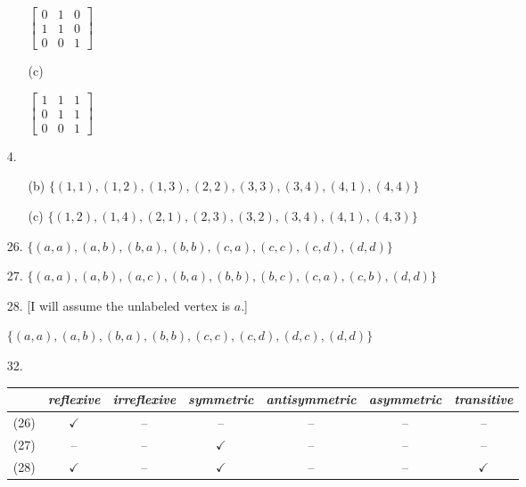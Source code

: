 \documentclass{article}
\begin{document}
\begin{enumerate}
\begin{itemize}
            \vspace{-0.1in}
                $\begin{bmatrix}
                0 & 1 & 0 \\
                1 & 1 & 0 \\
                0 & 0 & 1
                \end{bmatrix}$
            \item[(c)] \hfill

            \vspace{-0.1in}
                $\begin{bmatrix}
                1 & 1 & 1 \\
                0 & 1 & 1 \\
                0 & 0 & 1
                \end{bmatrix}$
        \end{itemize}
    \item[4.]
        \begin{itemize}
            \item[(b)] $\{ (1,1), (1,2), (1,3), (2,2), (3,3), (3,4), (4,1), (4,4) \}$
            \item[(c)] $\{ (1,2), (1,4), (2,1), (2,3), (3,2), (3,4), (4,1), (4,3) \}$
        \end{itemize}
    \item[26.] $\{ (a,a), (a,b), (b,a), (b,b), (c,a), (c,c), (c,d), (d,d) \}$
    \item[27.] $\{ (a,a), (a,b), (a,c), (b,a), (b,b), (b,c), (c,a), (c,b), (d,d) \}$
    \item[28.] [I will assume the unlabeled vertex is $a$.]

    $\{ (a,a), (a,b), (b,a), (b,b), (c,c), (c,d), (d,c), (d,d) \}$
    \item[32.]\hfill

    \vspace{-0.1in}
    \begin{tabular}{rcccccc}\hline
    & \emph{reflexive} & \emph{irreflexive} & \emph{symmetric} & \emph{antisymmetric} & \emph{asymmetric} & \emph{transitive}\\\hline
    (26) & $\checkmark$ & -- & -- & -- & -- & -- \\
    (27) & -- & -- & $\checkmark$ & -- & -- & -- \\
    (28) & $\checkmark$ & -- & $\checkmark$ & -- & -- & $\checkmark$ \\\hline
    \end{tabular}
\end{enumerate}
\end{document}
